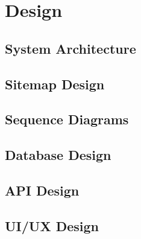 \chapter{Design}
\label{chap:design}

\section{System Architecture}
\label{sec:system-architecture}


\section{Sitemap Design}
\label{sec:sitemap-design}


\section{Sequence Diagrams}
\label{sec:sequence-diagram}


\section{Database Design}
\label{sec:database-design}


\section{API Design}
\label{sec:api-design}


\section{UI/UX Design}
\label{sec:ui-ux-design}

